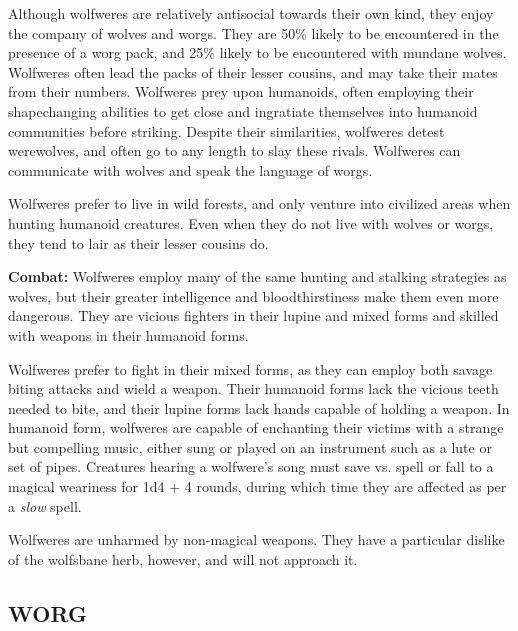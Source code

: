 \begin{multicols}{2}
Although wolfweres are relatively antisocial towards their own kind, they enjoy the company of wolves and worgs. They are 50\% likely to be encountered in the presence of a worg pack, and 25\% likely to be encountered with mundane wolves. Wolfweres often lead the packs of their lesser cousins, and may take their mates from their numbers. Wolfweres prey upon humanoids, often employing their shapechanging abilities to get close and ingratiate themselves into humanoid communities before striking. Despite their similarities, wolfweres detest werewolves, and often go to any length to slay these rivals. Wolfweres can communicate with wolves and speak the language of worgs.

Wolfweres prefer to live in wild forests, and only venture into civilized areas when hunting humanoid creatures. Even when they do not live with wolves or worgs, they tend to lair as their lesser cousins do.

\textbf{Combat:} Wolfweres employ many of the same hunting and stalking strategies as wolves, but their greater intelligence and bloodthirstiness make them even more dangerous. They are vicious fighters in their lupine and mixed forms and skilled with weapons in their humanoid forms.

Wolfweres prefer to fight in their mixed forms, as they can employ both savage biting attacks and wield a weapon. Their humanoid forms lack the vicious teeth needed to bite, and their lupine forms lack hands capable of holding a weapon. In humanoid form, wolfweres are capable of enchanting their victims with a strange but compelling music, either sung or played on an instrument such as a lute or set of pipes. Creatures hearing a wolfwere's song must save vs. spell or fall to a magical weariness for 1d4 + 4 rounds, during which time they are affected as per a \textit{slow} spell.

Wolfweres are unharmed by non-magical weapons. They have a particular dislike of the wolfsbane herb, however, and will not approach it.

\noindent
\begin{minipage}{\columnwidth}

\vspace{1em}

\subsection{WORG}


\end{minipage}
\end{multicols}
